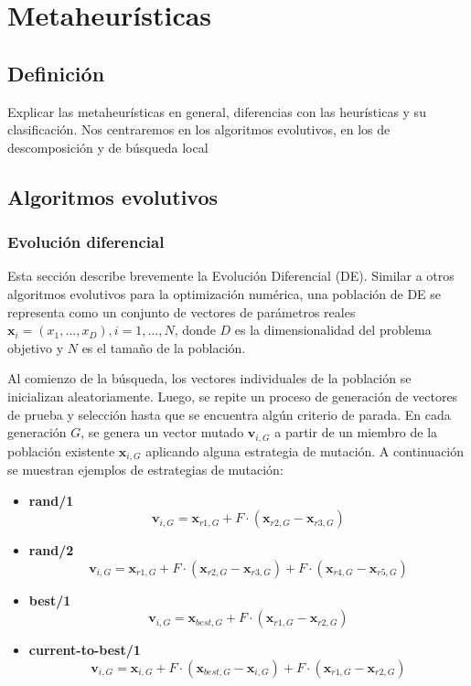 
\chapter{Metaheurísticas}

\section{Definición}
Explicar las metaheurísticas en general, diferencias con las heurísticas y su clasificación. Nos centraremos en los algoritmos evolutivos, en los de descomposición y de búsqueda local

\section{Algoritmos evolutivos}

\subsection{Evolución diferencial}

Esta sección describe brevemente la Evolución Diferencial (DE). Similar a otros algoritmos evolutivos para la optimización numérica, una población de DE se representa como un conjunto de vectores de parámetros reales \( \mathbf{x}_i = (x_{1}, \ldots, x_{D}), i = 1, \ldots, N \), donde \( D \) es la dimensionalidad del problema objetivo y \( N \) es el tamaño de la población. 

Al comienzo de la búsqueda, los vectores individuales de la población se inicializan aleatoriamente. Luego, se repite un proceso de generación de vectores de prueba y selección hasta que se encuentra algún criterio de parada. En cada generación \( G \), se genera un vector mutado \( \mathbf{v}_{i,G} \) a partir de un miembro de la población existente \( \mathbf{x}_{i,G} \) aplicando alguna estrategia de mutación. A continuación se muestran ejemplos de estrategias de mutación:

\begin{itemize}
    \item \textbf{rand/1}
    \[
    \mathbf{v}_{i,G} = \mathbf{x}_{r1,G} + F \cdot (\mathbf{x}_{r2,G} - \mathbf{x}_{r3,G})
    \]

    \item \textbf{rand/2}
    \[
    \mathbf{v}_{i,G} = \mathbf{x}_{r1,G} + F \cdot (\mathbf{x}_{r2,G} - \mathbf{x}_{r3,G}) + F \cdot (\mathbf{x}_{r4,G} - \mathbf{x}_{r5,G})
    \]

    \item \textbf{best/1}
    \[
    \mathbf{v}_{i,G} = \mathbf{x}_{best,G} + F \cdot (\mathbf{x}_{r1,G} - \mathbf{x}_{r2,G})
    \]

    \item \textbf{current-to-best/1}
    \[
    \mathbf{v}_{i,G} = \mathbf{x}_{i,G} + F \cdot (\mathbf{x}_{best,G} - \mathbf{x}_{i,G}) + F \cdot (\mathbf{x}_{r1,G} - \mathbf{x}_{r2,G})
    \]
\end{itemize}

